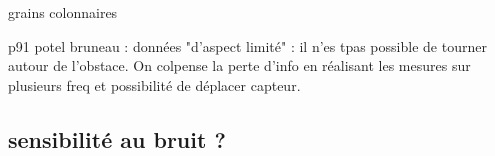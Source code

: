 
grains colonnaires

p91 potel bruneau : données "d'aspect limité" : il n'es tpas possible de tourner autour de l'obstace. On colpense la perte d'info en réalisant les mesures sur plusieurs freq et possibilité de déplacer capteur.




\subsection{sensibilité au bruit ?}



